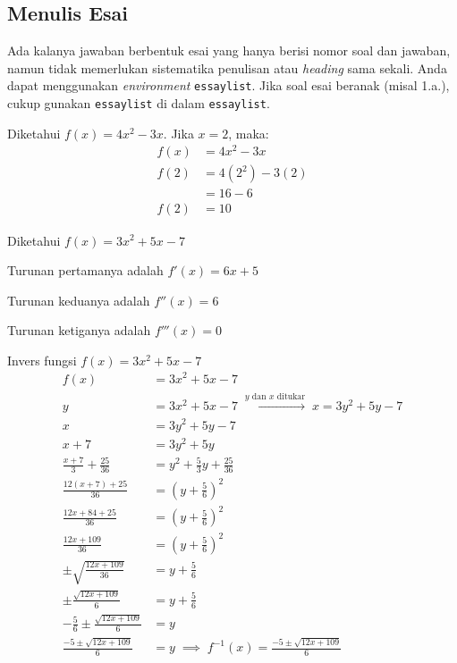 \subsection{Menulis Esai}

Ada kalanya jawaban berbentuk esai yang hanya berisi nomor soal dan jawaban, namun tidak memerlukan sistematika penulisan atau \textit{heading} sama sekali. Anda dapat menggunakan \textit{environment} \texttt{essaylist}. Jika soal esai beranak (misal 1.a.), cukup gunakan \texttt{essaylist} di dalam \texttt{essaylist}.

\begin{essaylist}
    \item Diketahui $f(x) = 4x^2 - 3x$. Jika $x = 2$, maka:
    \begin{align*}
        f(x) &= 4x^2 - 3x \\
        f(2) &= 4(2^2) - 3(2) \\
        &= 16 - 6 \\
        f(2) &= 10
    \end{align*}
    
    \item Diketahui $\displaystyle f(x) = 3x^2 + 5x - 7$
    \begin{essaylist}
        \item Turunan pertamanya adalah $f'(x) = 6x + 5$
        \item Turunan keduanya adalah $f''(x) = 6$
        \item Turunan ketiganya adalah $f'''(x) = 0$
    \end{essaylist}
    \item Invers fungsi $f(x) = 3x^2 + 5x - 7$
    \begin{align*}
        f(x) &= 3x^2 + 5x - 7 \\
        y &= 3x^2 + 5x - 7 \; \xrightarrow{y \text{ dan } x \text{ ditukar}} \; x = 3y^2 + 5y - 7 \\
        x &= 3y^2 + 5y - 7 \\
        x + 7 &= 3y^2 + 5y \\
        \frac{x + 7}{3} + \frac{25}{36} &= y^2 + \frac{5}{3}y + \frac{25}{36} \\
        \frac{12(x + 7) + 25}{36} &= \left(y + \frac{5}{6}\right)^2 \\
        \frac{12x + 84 + 25}{36} &= \left(y + \frac{5}{6}\right)^2 \\
        \frac{12x + 109}{36} &= \left(y + \frac{5}{6}\right)^2 \\
        \pm\sqrt{\frac{12x + 109}{36}} &= y + \frac{5}{6} \\
        \pm\frac{\sqrt{12x + 109}}{6} &= y + \frac{5}{6} \\
        -\frac{5}{6} \pm \frac{\sqrt{12x + 109}}{6} &= y \\
        \frac{-5 \pm \sqrt{12x + 109}}{6} &= y \; \implies \; \boxed{f^{-1}(x) = \frac{-5 \pm \sqrt{12x + 109}}{6}}
    \end{align*}
\end{essaylist}

